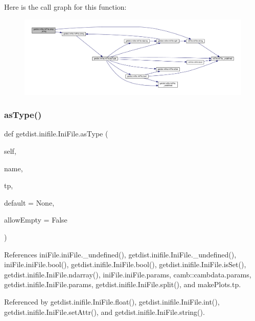 Here is the call graph for this function\+:
\nopagebreak
\begin{figure}[H]
\begin{center}
\leavevmode
\includegraphics[width=350pt]{classgetdist_1_1inifile_1_1IniFile_a274b4bdc84fb9806adf1d36dd2a7d0ba_cgraph}
\end{center}
\end{figure}
\mbox{\label{classgetdist_1_1inifile_1_1IniFile_a2ebf8b8ec5ec2f4776284314ae4d2a75}} 
\subsubsection{\texorpdfstring{as\+Type()}{asType()}}
{\footnotesize\ttfamily def getdist.\+inifile.\+Ini\+File.\+as\+Type (\begin{DoxyParamCaption}\item[{}]{self,  }\item[{}]{name,  }\item[{}]{tp,  }\item[{}]{default = {\ttfamily None},  }\item[{}]{allow\+Empty = {\ttfamily False} }\end{DoxyParamCaption})}



References ini\+File.\+ini\+File.\+\_\+undefined(), getdist.\+inifile.\+Ini\+File.\+\_\+undefined(), ini\+File.\+ini\+File.\+bool(), getdist.\+inifile.\+Ini\+File.\+bool(), getdist.\+inifile.\+Ini\+File.\+is\+Set(), getdist.\+inifile.\+Ini\+File.\+ndarray(), ini\+File.\+ini\+File.\+params, camb\+::cambdata.\+params, getdist.\+inifile.\+Ini\+File.\+params, getdist.\+inifile.\+Ini\+File.\+split(), and make\+Plots.\+tp.



Referenced by getdist.\+inifile.\+Ini\+File.\+float(), getdist.\+inifile.\+Ini\+File.\+int(), getdist.\+inifile.\+Ini\+File.\+set\+Attr(), and getdist.\+inifile.\+Ini\+File.\+string().

